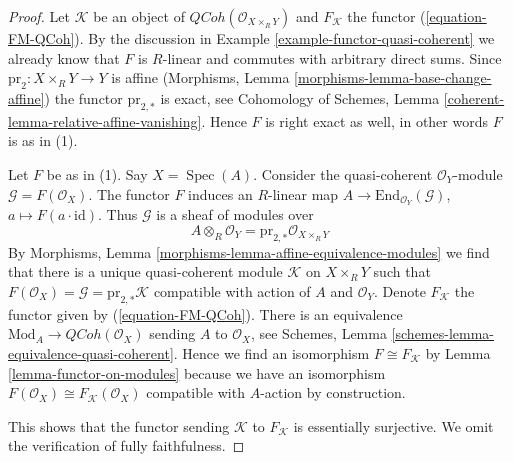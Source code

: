 \documentclass[10pt,a4paper]{amsart}
\theoremstyle{plain}
\theoremstyle{definition}
\theoremstyle{remark}
\numberwithin{equation}{subsection}
\def\Spec{\mathop{\mathrm{Spec}}}
\def\QCoh{\mathit{QCoh}}
\begin{document}
\begin{proof}
Let $\mathcal{K}$ be an object of $\QCoh(\mathcal{O}_{X \times_R Y})$
and $F_\mathcal{K}$ the functor (\ref{equation-FM-QCoh}). By the discussion in
Example \ref{example-functor-quasi-coherent} we already know that
$F$ is $R$-linear and commutes with arbitrary direct sums.
Since $\text{pr}_2 : X \times_R Y \to Y$ is affine
(Morphisms, Lemma \ref{morphisms-lemma-base-change-affine}) the functor
$\text{pr}_{2, *}$ is exact, see Cohomology of Schemes, Lemma
\ref{coherent-lemma-relative-affine-vanishing}.
Hence $F$ is right exact as well, in other words $F$ is as in (1).

\medskip\noindent
Let $F$ be as in (1). Say $X = \Spec(A)$. Consider the quasi-coherent
$\mathcal{O}_Y$-module $\mathcal{G} = F(\mathcal{O}_X)$.
The functor $F$ induces an $R$-linear map
$A \to \text{End}_{\mathcal{O}_Y}(\mathcal{G})$,
$a \mapsto F(a \cdot \text{id})$. Thus $\mathcal{G}$ is a sheaf of modules over
$$
A \otimes_R \mathcal{O}_Y = \text{pr}_{2, *}\mathcal{O}_{X \times_R Y}
$$
By Morphisms, Lemma \ref{morphisms-lemma-affine-equivalence-modules}
we find that there is a unique quasi-coherent module $\mathcal{K}$
on $X \times_R Y$ such that $F(\mathcal{O}_X) = \mathcal{G} =
\text{pr}_{2, *}\mathcal{K}$ compatible with action
of $A$ and $\mathcal{O}_Y$. Denote $F_\mathcal{K}$ the functor
given by (\ref{equation-FM-QCoh}). There is an equivalence
$\text{Mod}_A \to \QCoh(\mathcal{O}_X)$ sending $A$ to $\mathcal{O}_X$, see
Schemes, Lemma \ref{schemes-lemma-equivalence-quasi-coherent}.
Hence we find an isomorphism $F \cong F_\mathcal{K}$ by
Lemma \ref{lemma-functor-on-modules} because we have an isomorphism
$F(\mathcal{O}_X) \cong F_\mathcal{K}(\mathcal{O}_X)$ compatible with
$A$-action by construction.

\medskip\noindent
This shows that the functor sending $\mathcal{K}$ to $F_\mathcal{K}$
is essentially surjective. We omit the verification of fully faithfulness.
\end{proof}
\end{document}
